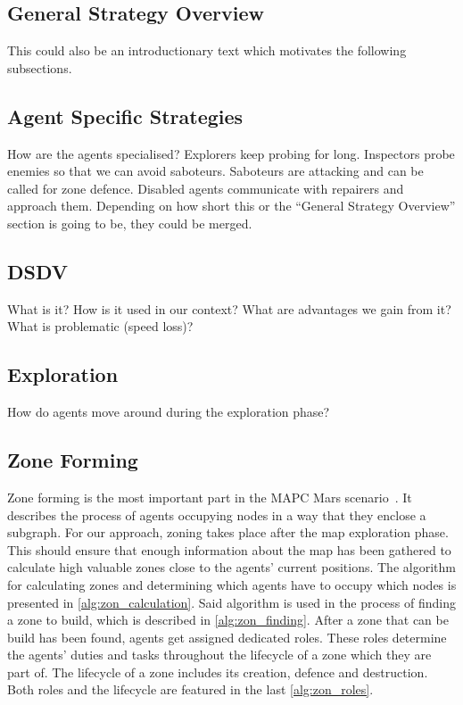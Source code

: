 \subsection{General Strategy Overview}
This could also be an introductionary text which motivates the following subsections.

\subsection{Agent Specific Strategies}
How are the agents specialised? Explorers keep probing for long. Inspectors probe enemies so that we can avoid saboteurs. Saboteurs are attacking and can be called for zone defence. Disabled agents communicate with repairers and approach them. Depending on how short this or the ``General Strategy Overview'' section is going to be, they could be merged.

\subsection{DSDV}
What is it? How is it used in our context? What are advantages we gain from it? What is problematic (speed loss)?

\subsection{Exploration}\label{alg:exploration}
How do agents move around during the exploration phase?

\subsection{Zone Forming}
Zone forming is the most important part in the MAPC Mars scenario~\cite{ahlbrecht_mapc_2014}.%
It describes the process of agents occupying nodes in a way that they enclose a subgraph. For our approach, zoning takes place after the map exploration phase. This should ensure that enough information about the map has been gathered to calculate high valuable zones close to the agents' current positions. The algorithm for calculating zones and determining which agents have to occupy which nodes is presented in \autoref{alg:zon_calculation}.
Said algorithm is used in the process of finding a zone to build, which is described in \autoref{alg:zon_finding}. After a zone that can be build has been found, agents get assigned dedicated roles. These roles determine the agents' duties and tasks throughout the lifecycle of a zone which they are part of. The lifecycle of a zone includes its creation, defence and destruction. Both roles and the lifecycle are featured in the last \autoref{alg:zon_roles}.




